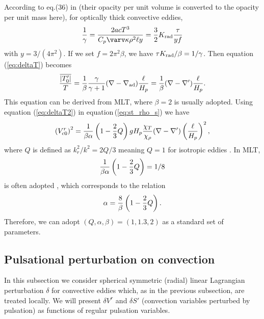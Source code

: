 \documentclass[fleqn,usenatbib]{mnras}
\begin{document}
According to eq.(36) in \citet{Henyey1965}(their opacity per unit volume is converted to the opacity per unit mass here),
 for optically thick convective eddies,
\begin{equation}
{1\over \gamma} = {2acT^3\over C_p\varv\kappa\rho^2\ell y}={3\over 2}K_{\rm rad}{\tau\over y f}
\end{equation}
with $y=3/(4\pi^2)$. If we set $f=2\pi^2\beta$, we have 
$\tau K_{\rm rad}/\beta = 1/\gamma$. Then equation (\ref{eq:deltaT}) becomes 
\begin{equation}
{\overline{|T_0'|}\over T} = {1\over\beta}{\gamma\over \gamma +1}
(\nabla-\nabla_{\rm ad}){\ell\over H_p}={1\over\beta}(\nabla-\nabla'){\ell\over H_p}.
\label{eq:deltaT2}
\end{equation}
This equation can be derived from MLT, where $\beta =2$ is usually adopted.
%
Using equation (\ref{eq:deltaT2}) in equation\,(\ref{eq:st_rho_s}) we have
\begin{equation}
\left(V_{{\rm c}0}^r\right)^2 = {1\over\beta\alpha}\left(1-{2\over 3}Q\right)gH_p
{\chi_T\over\chi_\rho}(\nabla-\nabla')\left({\ell\over H_p}\right)^2,
\label{eq:v02rv}
\end{equation}
where $Q$ is defined as $k_r^2/k^2 = 2Q/3$ meaning $Q=1$ for isotropic eddies
\citep{Gabriel1975}.
In MLT, 
\begin{equation}
{1\over\beta\alpha}\left(1-{2\over 3}Q\right) = 1/8 
\end{equation}
is often adopted \citep[e.g.][]{Henyey1965}, which corresponds to the relation
\begin{equation}
\alpha = {8\over\beta}\left(1-{2\over 3}Q\right).
\end{equation}
Therefore, we can adopt $(Q,\alpha,\beta)=(1, 1.3, 2)$ as a standard set of parameters.


\subsection{Pulsational perturbation on convection}
In this subsection we consider spherical symmetric (radial) linear Lagrangian 
perturbation $\delta$ for convective eddies which, as in the previous subsection,
are treated locally. We will present 
$\delta V^r$ and $\delta S'$ (convection variables perturbed by pulsation)
as functions of regular pulsation variables.
\end{document}
